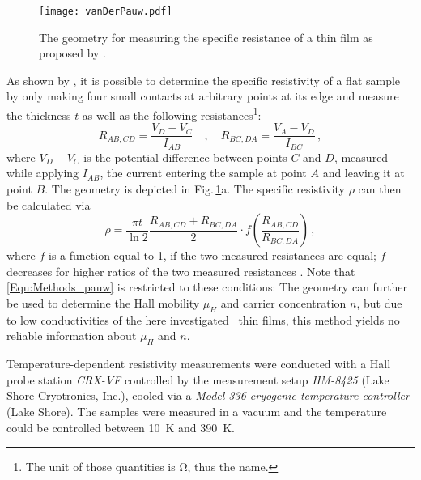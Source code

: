 \begin{figure}
    \centering
    \texttt{[image: vanDerPauw.pdf]}
    \caption{The geometry for measuring the specific resistance of a thin film as proposed by \textcite{pauw1958}.}
    \label{Fig:Methods_pauwGeometry}
\end{figure}

As shown by \textcite{pauw1958}, it is possible to determine the specific resistivity of a flat sample by only making four small contacts at arbitrary points at its edge and measure the thickness $t$ as well as the following resistances\footnote{
    The unit of those quantities is \unit{\ohm}, thus the name.
}:
\begin{equation}
    R_{AB,CD}=\frac{V_D-V_C}{I_{AB}}\quad , \quad
    R_{BC,DA}=\frac{V_A-V_D}{I_{BC}}\,,
\end{equation}
where $V_D-V_C$ is the potential difference between points $C$ and $D$, measured while applying $I_{AB}$, the current entering the sample at point $A$ and leaving it at point $B$.
The geometry is depicted in Fig.\,\ref{Fig:Methods_pauwGeometry}a.
The specific resistivity $\rho$ can then be calculated via
\begin{equation}
    \label{Equ:Methods_pauw}
    \rho=
    \frac{\pi t}{\ln2}
    \frac{R_{AB,CD}+R_{BC,DA}}{2}
    \cdot f\left(\frac{R_{AB,CD}}{R_{BC,DA}}\right)\,,
\end{equation}
where $f$ is a function equal to 1, if the two measured resistances are equal; $f$ decreases for higher ratios of the two measured resistances
    \cite{pauw1958}.
Note that \eqref{Equ:Methods_pauw} is restricted to these conditions:
The geometry can further be used to determine the Hall mobility $\mu_H$ and carrier concentration $n$, but due to low conductivities of the here investigated \cro\ thin films, this method yields no reliable information about $\mu_H$ and $n$.

Temperature-dependent resistivity measurements were conducted with a Hall probe station \textit{CRX-VF} controlled by the measurement setup \textit{HM-8425} (Lake Shore Cryotronics, Inc.), cooled via a \textit{Model 336 cryogenic temperature controller} (Lake Shore).
The samples were measured in a vacuum and the temperature could be controlled between \qty{10}{\kelvin} and \qty{390}{\kelvin}.
